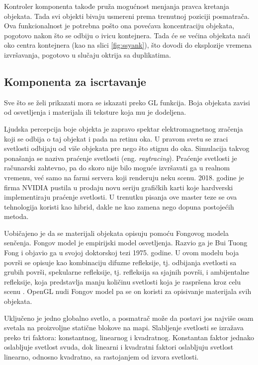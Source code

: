 \documentclass[12pt,oneside]{memoir}
\begin{document}
\begin{itemize}
\end{itemize}  

Kontroler komponenta takođe pruža mogućnost menjanja pravca kretanja objekata. 
Tada svi objekti bivaju usmereni prema trenutnoj poziciji posmatrača. 
Ova funkcionalnost je potrebna pošto ona povećava koncentraciju objekata, 
pogotovo nakon što se odbiju o ivicu kontejnera. Tada će se većina objekata 
naći oko centra kontejnera (kao na slici \ref{fig:ssyank}), što dovodi do eksplozije vremena izvršavanja, pogotovo u slučaju oktrija sa duplikatima.

\subsection{Komponenta za iscrtavanje}

Sve što se želi prikazati mora se iskazati preko GL funkcija. 
Boja objekata zavisi od osvetljenja i materijala ili teksture koja mu je dodeljena.

Ljudska percepcija boje objekta je zapravo spektar elektromagnetnog zračenja koji se odbija o taj objekat i pada na retinu oka.
U pravom svetu se zraci svetlosti odbijaju od više objekata pre nego što stignu do oka. 
Simulacija takvog ponašanja se naziva praćenje svetlosti (eng. {\em raytracing}).  
Praćenje svetlosti je računarski zahtevno, pa do skoro nije bilo moguće izvršavati ga u realnom vremenu, već samo na farmi servera koji renderuju neku scenu.
2018. godine je firma NVIDIA pustila u prodaju novu seriju grafičkih karti koje hardverski implementiraju praćenje svetlosti. 
U trenutku pisanja ove master teze se ova tehnologija koristi kao hibrid, dakle ne kao zamena nego dopuna postojećih metoda.

Uobičajeno je da se materijali objekata opisuju pomoću Fongovog modela senčenja. 
Fongov model je empirijski model osvetljenja. Razvio ga je Bui Tuong Fong i objavio ga u svojoj doktorskoj tezi 1975. godine.
U ovom modelu boja površi se opisuje kao kombinaciju difuzne refleksije, tj. odbijanja svetlosti sa grubih površi, 
spekularne refleksije, tj. refleksija sa sjajnih površi, i ambijentalne refleksije, koja predstavlja manju količinu svetlosti 
koja je raspršena kroz celu scenu \cite{Phong}.
OpenGL nudi Fongov model pa se on koristi za opisivanje materijala svih objekata.


Uključeno je jedno globalno svetlo, a posmatrač može da postavi jos najviše osam svetala na 
proizvoljne statične blokove na mapi. 
Slabljenje svetlosti se izražava preko tri faktora: konstantnog, linearnog i kvadratnog.
Konstantan faktor jednako oslabljuje svetlost svuda, dok linearni i kvadratni faktori oslabljuju svetlost
linearno, odnosno kvadratno, sa rastojanjem od izvora svetlosti.
\end{document}
